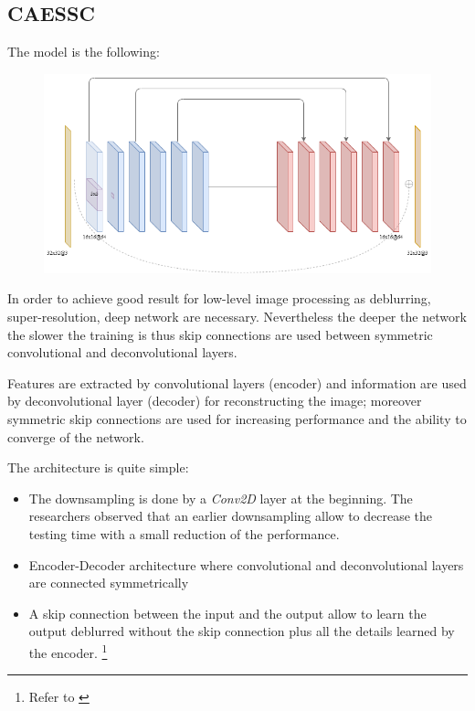 \subsection{CAESSC}
The model is the following:
\begin{figure}[H]
    \centering
    \includegraphics[scale=0.4]{subsections/caessc/caessc.png}
\end{figure}

In order to achieve good result for low-level image processing as deblurring, super-resolution, deep network are necessary.
Nevertheless the deeper the network the slower the training is thus skip connections are used between symmetric convolutional and deconvolutional layers.

Features are extracted by convolutional layers (encoder) and information are used by deconvolutional layer (decoder) for reconstructing the image; moreover symmetric  skip connections are used for increasing performance and the ability to converge of the network.

The architecture is quite simple:
\begin{itemize}
    \item The downsampling is done by a \textit{Conv2D} layer at the beginning.
    The researchers observed that an earlier downsampling allow to decrease the testing time with a small reduction of the performance.
    \item Encoder-Decoder architecture where convolutional and deconvolutional layers are connected symmetrically
    \item A skip connection between the input and the output allow to learn the output deblurred without the skip connection plus all the details learned by the encoder. \footnote{Refer to \cite[4.1 Analysis of the architecture]{CAESSC}} 
\end{itemize}

